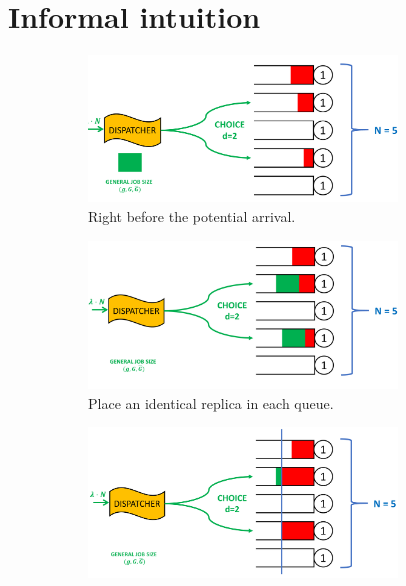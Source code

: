 \documentclass[12pt]{report}
\begin{document}
\section{Informal intuition} \label{sec:intuition_iden_repl}
\begin{figure}[t]
\begin{subfigure}{.45\textwidth}
\begin{center}
\includegraphics[width=0.9\textwidth]{figures/Chapter3/Redd1.PNG}
\caption{Right before the potential arrival.}
\label{fig:Redd1}
\end{center}
\end{subfigure}
\begin{subfigure}{.45\textwidth}
\begin{center}
\includegraphics[width=0.9\textwidth]{figures/Chapter3/Redd2.PNG}
\caption{Place an identical replica in each queue.}
\label{fig:Redd2}
\end{center}
\end{subfigure}
\begin{subfigure}{.45\textwidth}
\begin{center}
\includegraphics[width=0.9\textwidth]{figures/Chapter3/Redd3.PNG}

\end{center}
\end{subfigure}
\end{figure}
\end{document}

